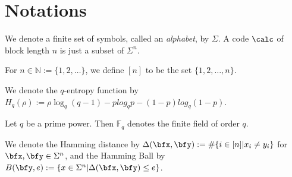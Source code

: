 


	
		\maketitle
	
	\newpage
	
	\begin{abstract}
		\noindent In the Hamming setup, we have seen that any code $\calc$ over the alphabet $\Sigma$ with distance $d$ can correct upto $\lfloor\frac{d-1}{2}\rfloor$ errors. The main goal of list decoding is to get past this bound. We shall also see that list decoding is, to an extent, the bridge between Hamming and Shannon.
		
	\end{abstract}
	
	\newpage
	
	\section*{Notations}
	
	\noindent We denote a finite set of symbols, called an \emph{alphabet}, by $\Sigma$. A code $\calc$ of block length $n$ is just a subset of $\Sigma^n$.
	\vspace{0.1in}
	
	\noindent For $n\in\mathbb{N} := \{1,2,\ldots\}$, we define $[n]$ to be the set $\{1,2,\ldots,n\}$.
	\vspace{0.1in}
	
	\noindent We denote the $q$-entropy function by $H_q(\rho) := \rho \log_q(q-1) - plog_qp - (1-p)log_q(1-p)$.
	\vspace{0.1in}
	
	\noindent Let $q$ be a prime power. Then $\mathbb{F}_q$ denotes the finite field of order $q$.
	\vspace{0.1in}
	
	\noindent We denote the Hamming distance by $\Delta(\bfx,\bfy) := \#\{i\in[n] | x_i \neq y_i\}$ for $\bfx, \bfy\in\Sigma^n$, and the Hamming Ball by $B(\bfy,e):=\{x\in\Sigma^n | \Delta(\bfx,\bfy)\leq e\}$.
	
	
	\newpage
	
	\tableofcontents	
	
	\newpage
	
